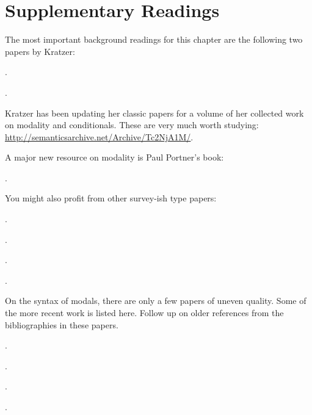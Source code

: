 \section{Supplementary Readings} \label{sec:suppl-read-modals}{\setlength{\parindent}{0pt}\setlength{\parskip}{6pt}

  The most important background readings for this chapter are the
  following two papers by Kratzer:

\begin{bibentrylist}
	\item {}.
	\item {}.
\end{bibentrylist}

Kratzer has been updating her classic papers for a volume of her
collected work on modality and conditionals. These are very much worth
studying: \url{http://semanticsarchive.net/Archive/Tc2NjA1M/}.

A major new resource on modality is Paul Portner's book:

\begin{bibentrylist}
  \item{}.
\end{bibentrylist}

You might also profit from other survey-ish type papers:

\begin{bibentrylist}
  \item {}.
  \item {}.
  \item {}.
  \item {}.
\end{bibentrylist}

On the syntax of modals, there are only a few papers of uneven
quality. Some of the more recent work is listed here. Follow up on
older references from the bibliographies in these papers.

\begin{bibentrylist}
	\item {}. 
	\item {}. 
	\item {}. 
	\item {}. 
\end{bibentrylist}

}
